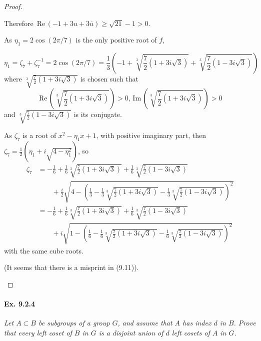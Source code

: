 \documentclass[11pt,a4paper]{article}
\newcommand{\re}{\,\mathrm{Re}\,}
\newcommand{\im}{\,\mathrm{Im}\,}
\begin{document}
\begin{proof}
\begin{enumerate}
Therefore $\re(-1+3u+3\overline{u}) \geq \sqrt{21} -1 >0$.

As $\eta_1 = 2\cos(2\pi/7)$ is the only positive root of $f$,

$$\eta_1 = \zeta_7+\zeta_7^{-1} =2 \cos(2\pi/7) =  \frac{1}{3}\left(-1+\sqrt[3]{\frac{7}{2} \left(1 + 3i\sqrt{3} \right)}+\sqrt[3]{\frac{7}{2} \left(1 - 3i\sqrt{3} \right)}\right)$$
where $\sqrt[3]{\frac{7}{2} \left(1 + 3i\sqrt{3} \right)}$ is chosen such that
$$\re\left(\sqrt[3]{\frac{7}{2} \left(1 + 3i\sqrt{3} \right)}\right)>0, \im\left(\sqrt[3]{\frac{7}{2} \left(1 + 3i\sqrt{3} \right)}\right)>0$$
and $\sqrt[3]{\frac{7}{2} \left(1 - 3i\sqrt{3} \right)}$ is its conjugate.

As $\zeta_7$ is a root of $x^2-\eta_1x +1$, with positive imaginary part, then $\zeta_7 = \frac{1}{2}\left(\eta_1 + i \sqrt{4 - \eta_1^2}\right)$, so
\begin{align*}
\zeta_7 &= -\frac{1}{6} + \frac{1}{6} \sqrt[3]{\frac{7}{2}(1+3i\sqrt{3})} + \frac{1}{6} \sqrt[3]{\frac{7}{2}(1-3i\sqrt{3})}\\
&\phantom{--}+\frac{i}{2} \sqrt{4 - \left ( \frac{1}{3} - \frac{1}{3} \sqrt[3]{\frac{7}{2}(1+3i\sqrt{3})} - \frac{1}{3} \sqrt[3]{\frac{7}{2}(1-3i\sqrt{3})}\right)^2}\\
&= -\frac{1}{6} + \frac{1}{6} \sqrt[3]{\frac{7}{2}(1+3i\sqrt{3})} + \frac{1}{6} \sqrt[3]{\frac{7}{2}(1-3i\sqrt{3})}\\
&\phantom{--}+i \sqrt{1 - \left ( \frac{1}{6} - \frac{1}{6} \sqrt[3]{\frac{7}{2}(1+3i\sqrt{3})} - \frac{1}{6} \sqrt[3]{\frac{7}{2}(1-3i\sqrt{3})}\right)^2}
\end{align*}
with the same cube roots.

(It seems that there is a misprint in (9.11)).
\end{enumerate}
\end{proof}

\paragraph{Ex. 9.2.4}

{\it Let $A\subset B$ be subgroups of a group $G$, and assume that $A$ has index $d$ in $B$. Prove that every left coset of $B$ in $G$ is a disjoint union of $d$ left cosets of $A$ in $G$.
}
\end{document}

